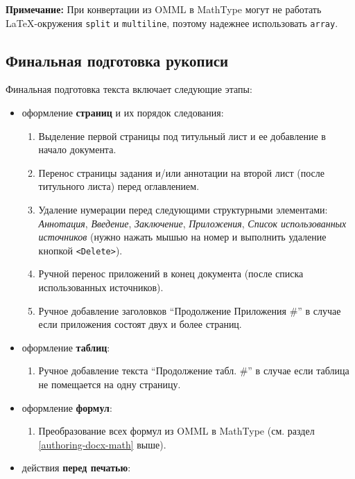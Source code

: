 \documentclass[
  a4paper,
]{book}
\providecommand{\tightlist}{%
  \setlength{\itemsep}{0pt}\setlength{\parskip}{0pt}}
\theoremstyle{definition}
\theoremstyle{definition}
\theoremstyle{definition}
\theoremstyle{definition}
\theoremstyle{remark}
\begin{document}
\textbf{Примечание:} При конвертации из OMML в MathType могут не работать LaTeX-окружения \texttt{split} и \texttt{multiline}, поэтому надежнее использовать \texttt{array}.

\hypertarget{authoring-docx-final}{%
\subsection{Финальная подготовка рукописи}\label{authoring-docx-final}}

Финальная подготовка текста включает следующие этапы:

\begin{itemize}
\item
  оформление \textbf{страниц} и их порядок следования:

  \begin{enumerate}
  \def\labelenumi{\arabic{enumi}.}
  \tightlist
  \item
    Выделение первой страницы под титульный лист и ее добавление в начало документа.
  \item
    Перенос страницы задания и/или аннотации на второй лист (после титульного листа) перед оглавлением.
  \item
    Удаление нумерации перед следующими структурными элементами: \emph{Аннотация}, \emph{Введение}, \emph{Заключение}, \emph{Приложения}, \emph{Список использованных источников} (нужно нажать мышью на номер и выполнить удаление кнопкой \texttt{\textless{}Delete\textgreater{}}).
  \item
    Ручной перенос приложений в конец документа (после списка использованных источников).
  \item
    Ручное добавление заголовков ``Продолжение Приложения \#'' в случае если приложения состоят двух и более страниц.
  \end{enumerate}
\item
  оформление \textbf{таблиц}:

  \begin{enumerate}
  \def\labelenumi{\arabic{enumi}.}
  \tightlist
  \item
    Ручное добавление текста ``Продолжение табл. \#'' в случае если таблица не помещается на одну страницу.
  \end{enumerate}
\item
  оформление \textbf{формул}:

  \begin{enumerate}
  \def\labelenumi{\arabic{enumi}.}
  \tightlist
  \item
    Преобразование всех формул из OMML в MathType (см. раздел \ref{authoring-docx-math} выше).
  \end{enumerate}
\item
  действия \textbf{перед печатью}:


\end{itemize}
\end{document}
